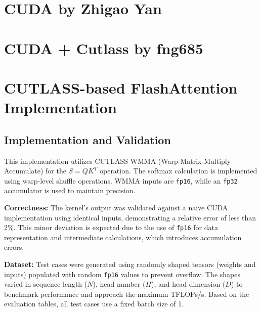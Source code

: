 \documentclass[11pt]{article}
\begin{document}

\section{CUDA by Zhigao Yan}

\section{CUDA + Cutlass by fng685}


\section{CUTLASS-based FlashAttention Implementation}

\subsection{Implementation and Validation}
This implementation utilizes CUTLASS WMMA (Warp-Matrix-Multiply-Accumulate) for the $S=QK^{T}$ operation. The softmax calculation is implemented using warp-level shuffle operations. WMMA inputs are \texttt{fp16}, while an \texttt{fp32} accumulator is used to maintain precision.

\textbf{Correctness:} The kernel's output was validated against a naive CUDA implementation using identical inputs, demonstrating a relative error of less than 2\%. This minor deviation is expected due to the use of \texttt{fp16} for data representation and intermediate calculations, which introduces accumulation errors.

\textbf{Dataset:} Test cases were generated using randomly shaped tensors (weights and inputs) populated with random \texttt{fp16} values to prevent overflow. The shapes varied in sequence length ($N$), head number ($H$), and head dimension ($D$) to benchmark performance and approach the maximum TFLOPs/s. Based on the evaluation tables, all test cases use a fixed batch size of 1.
\end{document}
